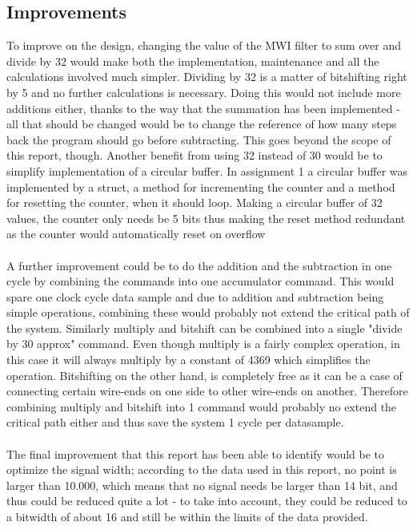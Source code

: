 \documentclass[12pt,a4paper]{article}
\begin{document}
\subsection{Improvements}
To improve on the design, changing the value of the MWI filter to sum over and divide by 32 would make both the implementation, maintenance and all the calculations involved much simpler. Dividing by 32 is a matter of bitshifting right by 5 and no further calculations is necessary. Doing this would not include more additions either, thanks to the way that the summation has been implemented - all that should be changed would be to change the reference of how many steps back the program should go before subtracting. This goes beyond the scope of this report, though.
Another benefit from using 32 instead of 30 would be to simplify implementation of a circular buffer. In assignment 1 a circular buffer was implemented by a struct, a method for incrementing the counter and a method for resetting the counter, when it should loop. Making a circular buffer of 32 values, the counter only needs be 5 bits thus making the reset method redundant as the counter would automatically reset on overflow\\
\\
A further improvement could be to do the addition and the subtraction in one cycle by combining the commands into one accumulator command. This would spare one clock cycle data sample and due to addition and subtraction being simple operations, combining these would probably not extend the critical path of the system. Similarly multiply and bitshift can be combined into a single "divide by 30 approx" command. Even though multiply is a fairly complex operation, in this case it will always multiply by a constant of 4369 which simplifies the operation. Bitshifting on the other hand, is completely free as it can be a case of connecting certain wire-ends on one side to other wire-ends on another. Therefore combining multiply and bitshift into 1 command would probably no extend the critical path either and thus save the system 1 cycle per datasample.\\
\\
The final improvement that this report has been able to identify would be to optimize the signal width; according to the data used in this report, no point is larger than 10.000, which means that no signal needs be larger than 14 bit, and thus could be reduced quite a lot - to take into account, they could be reduced to a bitwidth of about 16 and still be within the limits of the data provided.\\
\end{document}
